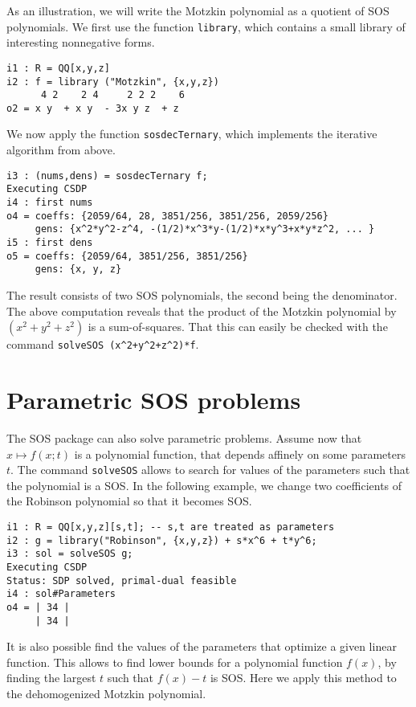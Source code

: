 \documentclass[11pt]{amsart}
\theoremstyle{plain}%
\theoremstyle{definition}
\theoremstyle{remark}
\newcommand{\SOS}{\textsc{SOS}\xspace}
\begin{document}
As an illustration, we will write the Motzkin polynomial as a quotient of SOS polynomials.
We first use the function \verb|library|, which contains a small library of interesting nonnegative forms.
{\small
\begin{verbatim}
i1 : R = QQ[x,y,z]
i2 : f = library ("Motzkin", {x,y,z})
      4 2    2 4     2 2 2    6
o2 = x y  + x y  - 3x y z  + z
\end{verbatim}
}
\noindent
We now apply the function \verb|sosdecTernary|, which implements the iterative algorithm from above.
{\small
\begin{verbatim}
i3 : (nums,dens) = sosdecTernary f;
Executing CSDP
i4 : first nums
o4 = coeffs: {2059/64, 28, 3851/256, 3851/256, 2059/256}
     gens: {x^2*y^2-z^4, -(1/2)*x^3*y-(1/2)*x*y^3+x*y*z^2, ... }
i5 : first dens
o5 = coeffs: {2059/64, 3851/256, 3851/256}
     gens: {x, y, z}
\end{verbatim}
}
\noindent
The result consists of two SOS polynomials, the second being the denominator.
The above computation reveals that the product of the Motzkin polynomial by $(x^2{+}y^2{+}z^2)$ is a sum-of-squares.
That this can easily be checked with the command \verb|solveSOS (x^2+y^2+z^2)*f|.

\section{Parametric SOS problems}

The \SOS package can also solve parametric problems.
Assume now that $x \mapsto f(x;t)$ is a polynomial function, that depends affinely on some parameters~$t$.
The command \verb|solveSOS| allows to search for values of the parameters such that the polynomial is a SOS.
In the following example, we change two coefficients of the Robinson polynomial so that it becomes SOS.
{\small
\begin{verbatim}
i1 : R = QQ[x,y,z][s,t]; -- s,t are treated as parameters
i2 : g = library("Robinson", {x,y,z}) + s*x^6 + t*y^6;
i3 : sol = solveSOS g;
Executing CSDP
Status: SDP solved, primal-dual feasible
i4 : sol#Parameters
o4 = | 34 |
     | 34 |
\end{verbatim}
}

It is also possible find the values of the parameters that optimize a given linear function.
This allows to find lower bounds for a polynomial function $f(x)$,
by finding the largest $t$ such that $f(x)-t$ is SOS.
Here we apply this method to the dehomogenized Motzkin polynomial.
\end{document}
